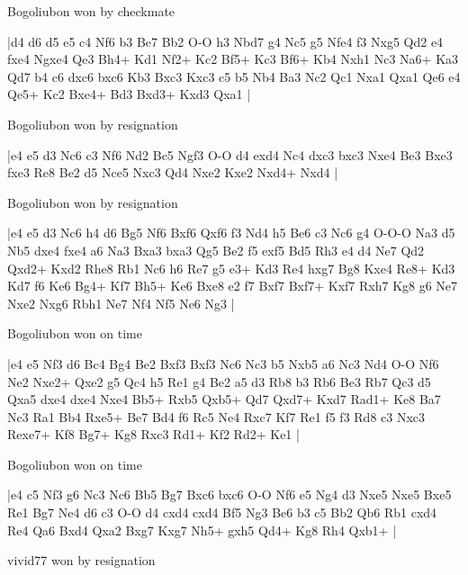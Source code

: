 \showboard

Bogoliubon won by checkmate

\makegametitle
|d4 d6 d5 e5 c4 Nf6 b3 Be7 Bb2 O-O h3 Nbd7 g4 Nc5 g5 Nfe4 f3 Nxg5 Qd2 e4 fxe4 Ngxe4 Qe3 Bh4+ Kd1 Nf2+ Kc2 Bf5+ Kc3 Bf6+ Kb4 Nxh1 Nc3 Na6+ Ka3 Qd7 b4 c6 dxc6 bxc6 Kb3 Bxc3 Kxc3 c5 b5 Nb4 Ba3 Nc2 Qc1 Nxa1 Qxa1 Qe6 e4 Qe5+ Kc2 Bxe4+ Bd3 Bxd3+ Kxd3 Qxa1  |

\showboard

Bogoliubon won by resignation

\makegametitle
|e4 e5 d3 Nc6 c3 Nf6 Nd2 Bc5 Ngf3 O-O d4 exd4 Nc4 dxc3 bxc3 Nxe4 Be3 Bxe3 fxe3 Re8 Be2 d5 Nce5 Nxc3 Qd4 Nxe2 Kxe2 Nxd4+ Nxd4  |

\showboard

Bogoliubon won by resignation

\makegametitle
|e4 e5 d3 Nc6 h4 d6 Bg5 Nf6 Bxf6 Qxf6 f3 Nd4 h5 Be6 c3 Nc6 g4 O-O-O Na3 d5 Nb5 dxe4 fxe4 a6 Na3 Bxa3 bxa3 Qg5 Be2 f5 exf5 Bd5 Rh3 e4 d4 Ne7 Qd2 Qxd2+ Kxd2 Rhe8 Rb1 Nc6 h6 Re7 g5 e3+ Kd3 Re4 hxg7 Bg8 Kxe4 Re8+ Kd3 Kd7 f6 Ke6 Bg4+ Kf7 Bh5+ Ke6 Bxe8 e2 f7 Bxf7 Bxf7+ Kxf7 Rxh7 Kg8 g6 Ne7 Nxe2 Nxg6 Rbh1 Ne7 Nf4 Nf5 Ne6 Ng3  |

\showboard

Bogoliubon won on time

\makegametitle
|e4 e5 Nf3 d6 Bc4 Bg4 Be2 Bxf3 Bxf3 Nc6 Nc3 b5 Nxb5 a6 Nc3 Nd4 O-O Nf6 Ne2 Nxe2+ Qxe2 g5 Qc4 h5 Re1 g4 Be2 a5 d3 Rb8 b3 Rb6 Be3 Rb7 Qc3 d5 Qxa5 dxe4 dxe4 Nxe4 Bb5+ Rxb5 Qxb5+ Qd7 Qxd7+ Kxd7 Rad1+ Ke8 Ba7 Nc3 Ra1 Bb4 Rxe5+ Be7 Bd4 f6 Rc5 Ne4 Rxc7 Kf7 Re1 f5 f3 Rd8 c3 Nxc3 Rexe7+ Kf8 Bg7+ Kg8 Rxc3 Rd1+ Kf2 Rd2+ Ke1  |

\showboard

Bogoliubon won on time

\makegametitle
|e4 c5 Nf3 g6 Nc3 Nc6 Bb5 Bg7 Bxc6 bxc6 O-O Nf6 e5 Ng4 d3 Nxe5 Nxe5 Bxe5 Re1 Bg7 Ne4 d6 c3 O-O d4 cxd4 cxd4 Bf5 Ng3 Be6 b3 c5 Bb2 Qb6 Rb1 cxd4 Re4 Qa6 Bxd4 Qxa2 Bxg7 Kxg7 Nh5+ gxh5 Qd4+ Kg8 Rh4 Qxb1+  |

\showboard

vivid77 won by resignation

